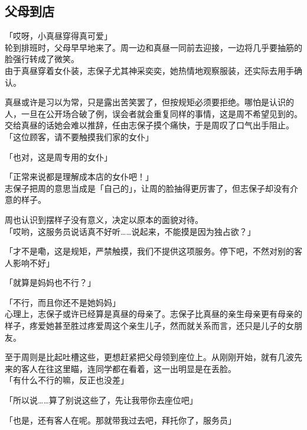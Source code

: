 \subsection{父母到店}

「哎呀，小真昼穿得真可爱」\\

轮到排班时，父母早早地来了。周一边和真昼一同前去迎接，一边将几乎要抽筋的脸强行转成了微笑。\\

由于真昼穿着女仆装，志保子尤其神采奕奕，她热情地观察服装，还实际去用手确认。

真昼或许是习以为常，只是露出苦笑罢了，但按规矩必须要拒绝。哪怕是认识的人，一旦在公开场合破了例，误会者就会重复同样的事情，这是周不希望见到的。\\

交给真昼的话她会难以推辞，任由志保子摸个痛快，于是周叹了口气出手阻止。\\

「这位顾客，请不要触摸我们家的女仆」

「也对，这是周专用的女仆」

「正常来说都是理解成本店的女仆吧！」\\

志保子把周的意思当成是「自己的」，让周的脸抽得更厉害了，但志保子却没有介意的样子。

周也认识到摆样子没有意义，决定以原本的面貌对待。\\

「哎哟，这服务员说话真不好听……说起来，不能摸是因为独占欲？」

「才不是嘞，这是规矩，严禁触摸，我们不提供这项服务。停下吧，不然对别的客人影响不好」

「就算是妈妈也不行？」

「不行，而且你还不是她妈妈」\\

心理上，志保子或许已经算是真昼的母亲了。志保子比真昼的亲生母亲更有母亲的样子，疼爱她甚至胜过疼爱周这个亲生儿子，然而就关系而言，还只是儿子的女朋友。

至于周则是比起吐槽这些，更想赶紧把父母领到座位上。从刚刚开始，就有几波先来的客人在往这里瞄，连同学都在看着，这一出明显是在丢脸。\\

「有什么不行的嘛，反正也没差」

「所以说……算了别说这些了，先让我带你去座位吧」

「也是，还有客人在呢。那就带我过去吧，拜托你了，服务员」\\

